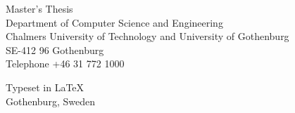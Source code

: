 Master's Thesis \the\year\\	%
Department of Computer Science and Engineering\\
Chalmers University of Technology and University of Gothenburg\\
SE-412 96 Gothenburg\\
Telephone +46 31 772 1000 \setlength{\parskip}{0.5cm}

\vfill


Typeset in \LaTeX \\
Gothenburg, Sweden \the\year

